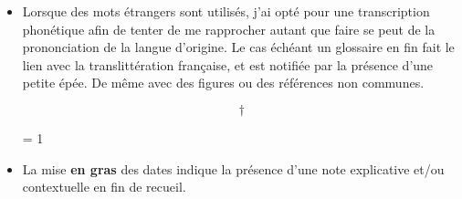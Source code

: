 

\begin{center}
    \vspace*{\fill}
    \begin{minipage}{0.8\linewidth}
   

\begin{itemize}[label = $\bullet$]
    \item Lorsque des mots étrangers sont utilisés,
        j'ai opté pour une transcription phonétique afin de
        tenter de me rapprocher autant que faire se peut
        de la prononciation de la langue d'origine.
        Le cas échéant un glossaire en fin fait le lien avec
        la translittération française, et est notifiée par la
        présence d'une petite épée.
        De même avec des figures ou des références non
        communes.
        
        $$\dagger$$

    \ifnum\isPayant = 1
        \item La mise \textbf{en gras} des dates indique la présence
            d'une note explicative et/ou contextuelle en fin de
            recueil.
    \fi
\end{itemize}


    \end{minipage}
    \vspace*{\fill}
\end{center}
\myPageBreak
